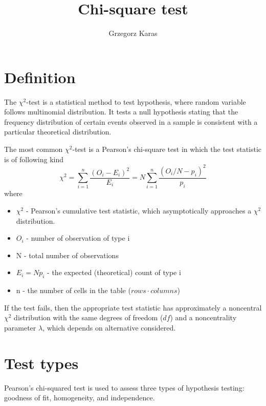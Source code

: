 \documentclass{article}
\title{Chi-square test}
\author{Grzegorz Karas}
\begin{document}
\maketitle


\section{Definition \cite{wiki, paper}}
The $\chi^2$-test is a statistical method to test hypothesis, where random variable
follows multinomial distribution. It tests a null hypothesis stating that the frequency distribution of certain 
events observed in a sample is consistent with a particular theoretical distribution.

The most common $\chi^2$-test is a Pearson's chi-square test in which the test statistic is of following kind
\begin{equation}
    \chi^2=\sum_{i=1}^n \frac{\left(O_i-E_i\right)^2}{E_i} = N \sum_{i=1}^n \frac{\left(O_i/N-p_i\right)^2}{p_i}
\end{equation}
where
\begin{itemize}
    \item $\chi^2$ - Pearson's cumulative test statistic, which asymptotically approaches a $\chi^2$ distribution.
    \item $O_i$ - number of observation of type i
    \item N - total number of observations
    \item $E_i = Np_i$ - the expected (theoretical) count of type i
    \item n - the number of cells in the table ($rows\cdot columns$)
\end{itemize}

If the test fails, then the appropriate test statistic has approximately 
a noncentral $\chi^2$ distribution with the same degrees of freedom ($df$) and
a noncentrality parameter $\lambda$, which depends on alternative considered.

\section{Test types \cite{wiki}}
Pearson's chi-squared test is used to assess three types of hypothesis testing: 
goodness of fit, homogeneity, and independence.
\end{document}
